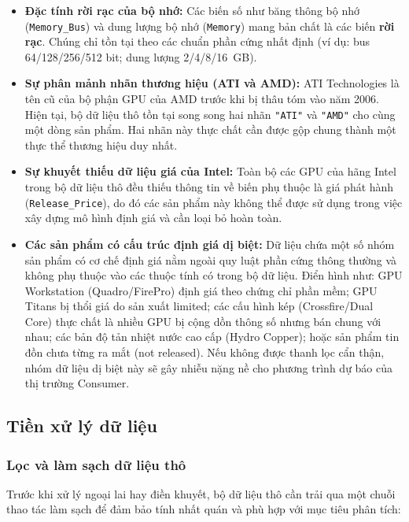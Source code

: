 \begin{itemize}
  \item \textbf{Đặc tính rời rạc của bộ nhớ:} Các biến số như băng thông bộ nhớ (\texttt{Memory\_Bus}) và dung lượng bộ nhớ (\texttt{Memory}) mang bản chất là các biến \textbf{rời rạc}. Chúng chỉ tồn tại theo các chuẩn phần cứng nhất định (ví dụ: bus 64/128/256/512 bit; dung lượng 2/4/8/16~GB).
  \item \textbf{Sự phân mảnh nhãn thương hiệu (ATI và AMD):} ATI Technologies là tên cũ của bộ phận GPU của AMD trước khi bị thâu tóm vào năm 2006. Hiện tại, bộ dữ liệu thô tồn tại song song hai nhãn \texttt{"ATI"} và \texttt{"AMD"} cho cùng một dòng sản phẩm. Hai nhãn này thực chất cần được gộp chung thành một thực thể thương hiệu duy nhất.
  \item \textbf{Sự khuyết thiếu dữ liệu giá của Intel:} Toàn bộ các GPU của hãng Intel trong bộ dữ liệu thô đều thiếu thông tin về biến phụ thuộc là giá phát hành (\texttt{Release\_Price}), do đó các sản phẩm này không thể được sử dụng trong việc xây dựng mô hình định giá và cần loại bỏ hoàn toàn.
  \item \textbf{Các sản phẩm có cấu trúc định giá dị biệt:} Dữ liệu chứa một số nhóm sản phẩm có cơ chế định giá nằm ngoài quy luật phần cứng thông thường và không phụ thuộc vào các thuộc tính có trong bộ dữ liệu. Điển hình như: GPU Workstation (Quadro/FirePro) định giá theo chứng chỉ phần mềm; GPU Titans bị thổi giá do sản xuất limited; các cấu hình kép (Crossfire/Dual Core) thực chất là nhiều GPU bị cộng dồn thông số nhưng bán chung với nhau; các bản độ tản nhiệt nước cao cấp (Hydro Copper); hoặc sản phẩm tin đồn chưa từng ra mắt (not released). Nếu không được thanh lọc cẩn thận, nhóm dữ liệu dị biệt này sẽ gây nhiễu nặng nề cho phương trình dự báo của thị trường Consumer.
\end{itemize}

\subsection{Tiền xử lý dữ liệu}

\subsubsection{Lọc và làm sạch dữ liệu thô}

Trước khi xử lý ngoại lai hay điền khuyết, bộ dữ liệu thô cần trải qua một chuỗi thao tác làm sạch để đảm bảo tính nhất quán và phù hợp với mục tiêu phân tích:


